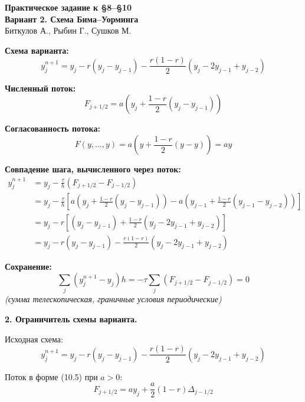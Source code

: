 \documentclass[12pt]{article}
\begin{document}
\begin{center}
\textbf{Практическое задание к \S8--\S10}\\
\textbf{Вариант 2. Схема Бима--Уорминга}\\[4pt]
Биткулов А., Рыбин Г., Сушков М.
\end{center}


\noindent\textbf{Схема варианта:}
\begin{equation}
y_j^{n+1} = y_j - r(y_j - y_{j-1}) - \frac{r(1-r)}{2}(y_j - 2y_{j-1} + y_{j-2})
\end{equation}

\noindent\textbf{Численный поток:}
\begin{equation}
F_{j+1/2} = a \left( y_j + \frac{1-r}{2}(y_j - y_{j-1}) \right)
\end{equation}

\noindent\textbf{Согласованность потока:}
\begin{equation}
F(y, \dots, y) = a \left( y + \frac{1-r}{2}(y - y) \right) = ay
\end{equation}

\noindent\textbf{Совпадение шага, вычисленного через поток:}
\begin{align*}
y_j^{n+1} &= y_j - \frac{\tau}{h}(F_{j+1/2} - F_{j-1/2}) \\
&= y_j - \frac{\tau}{h} \left[ a \left( y_j + \frac{1-r}{2}(y_j - y_{j-1}) \right) - a \left( y_{j-1} + \frac{1-r}{2}(y_{j-1} - y_{j-2}) \right) \right] \\
&= y_j - r \left[ (y_j - y_{j-1}) + \frac{1-r}{2}(y_j - 2y_{j-1} + y_{j-2}) \right] \\
&= y_j - r(y_j - y_{j-1}) - \frac{r(1-r)}{2}(y_j - 2y_{j-1} + y_{j-2})
\end{align*}

\noindent\textbf{Сохранение:}
\begin{equation}
\sum_j (y_j^{n+1} - y_j)h = -\tau \sum_j (F_{j+1/2} - F_{j-1/2}) = 0
\end{equation}
\textit{(сумма телескопическая, граничные условия периодические)}

\noindent\textbf{2. Ограничитель схемы варианта.}

\noindent Исходная схема:
\begin{equation*}
y_j^{n+1} = y_j - r(y_j - y_{j-1}) - \frac{r(1-r)}{2}(y_j - 2y_{j-1} + y_{j-2})
\end{equation*}

\noindent Поток в форме (10.5) при \(a > 0\):
\begin{equation*}
F_{j+1/2} = a y_j + \frac{a}{2}(1-r)\Delta_{j-1/2}
\end{equation*}
\end{document}

